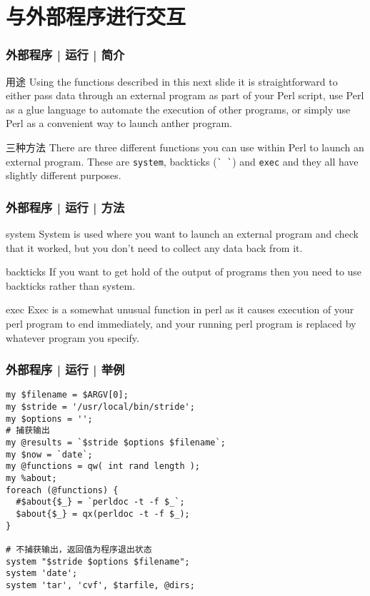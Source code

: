 \section{与外部程序进行交互}
\begin{frame}[fragile]
  \frametitle{外部程序 | 运行 | 简介}
  \begin{block}{用途}
    Using the functions described in this next slide it is straightforward to either pass data through an external program as part of your Perl script, use Perl as a glue language to automate the execution of other programs, or simply use Perl as a convenient way to launch anther program.
  \end{block}
  \pause
  \begin{block}{三种方法}
    There are three different functions you can use within Perl to launch an external program. These are \verb|system|, backticks (\verb|` `|) and \verb|exec| and they all have slightly different purposes.
  \end{block}
\end{frame}

\begin{frame}[fragile]
  \frametitle{外部程序 | 运行 | 方法}
  \begin{block}{system}
    System is used where you want to launch an external program and check that it worked, but
you don't need to collect any data back from it.
  \end{block}
  \pause
  \begin{block}{backticks}
    If you want to get hold of the output of programs then you need to use backticks rather than system.
  \end{block}
  \pause
  \begin{block}{exec}
    Exec is a somewhat unusual function in perl as it causes execution of your perl program to end immediately, and your running perl program is replaced by whatever program you specify.
  \end{block}
\end{frame}

\begin{frame}[fragile]
  \frametitle{外部程序 | 运行 | 举例}
  \vspace{-1.5em}
\begin{lstlisting}[basicstyle=\small\tt]
my $filename = $ARGV[0];
my $stride = '/usr/local/bin/stride';
my $options = '';
# 捕获输出
my @results = `$stride $options $filename`;
my $now = `date`;
my @functions = qw( int rand length );
my %about;
foreach (@functions) {
  #$about{$_} = `perldoc -t -f $_`;
  $about{$_} = qx(perldoc -t -f $_);
}

# 不捕获输出，返回值为程序退出状态
system "$stride $options $filename";
system 'date';
system 'tar', 'cvf', $tarfile, @dirs;
\end{lstlisting}
\end{frame}

